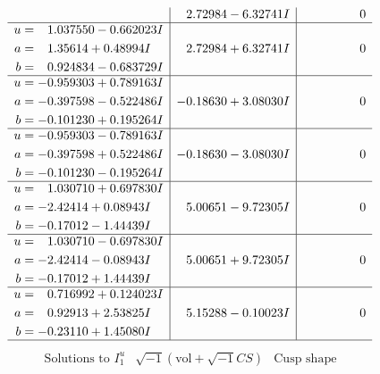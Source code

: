 \documentclass[1p]{elsarticle_modified}
\theoremstyle{definition}
\newcommand{\I}{\sqrt{-1}}
\begin{document}
$$\begin{array}{c|c|c}
 & \phantom{-}2.72984 - 6.32741 I & \phantom{-0.000000 } 0 \\ \hline\begin{aligned}
u &= \phantom{-}1.037550 - 0.662023 I \\
a &= \phantom{-}1.35614 + 0.48994 I \\
b &= \phantom{-}0.924834 - 0.683729 I\end{aligned}
 & \phantom{-}2.72984 + 6.32741 I & \phantom{-0.000000 } 0 \\ \hline\begin{aligned}
u &= -0.959303 + 0.789163 I \\
a &= -0.397598 - 0.522486 I \\
b &= -0.101230 + 0.195264 I\end{aligned}
 & -0.18630 + 3.08030 I & \phantom{-0.000000 } 0 \\ \hline\begin{aligned}
u &= -0.959303 - 0.789163 I \\
a &= -0.397598 + 0.522486 I \\
b &= -0.101230 - 0.195264 I\end{aligned}
 & -0.18630 - 3.08030 I & \phantom{-0.000000 } 0 \\ \hline\begin{aligned}
u &= \phantom{-}1.030710 + 0.697830 I \\
a &= -2.42414 + 0.08943 I \\
b &= -0.17012 - 1.44439 I\end{aligned}
 & \phantom{-}5.00651 - 9.72305 I & \phantom{-0.000000 } 0 \\ \hline\begin{aligned}
u &= \phantom{-}1.030710 - 0.697830 I \\
a &= -2.42414 - 0.08943 I \\
b &= -0.17012 + 1.44439 I\end{aligned}
 & \phantom{-}5.00651 + 9.72305 I & \phantom{-0.000000 } 0 \\ \hline\begin{aligned}
u &= \phantom{-}0.716992 + 0.124023 I \\
a &= \phantom{-}0.92913 + 2.53825 I \\
b &= -0.23110 + 1.45080 I\end{aligned}
 & \phantom{-}5.15288 - 0.10023 I & \phantom{-0.000000 } 0\\
 \hline 
 \end{array}$$\newpage$$\begin{array}{c|c|c}  
\text{Solutions to }I^u_{1}& \I (\text{vol} + \sqrt{-1}CS) & \text{Cusp shape}\\

\end{array}$$
\end{document}
